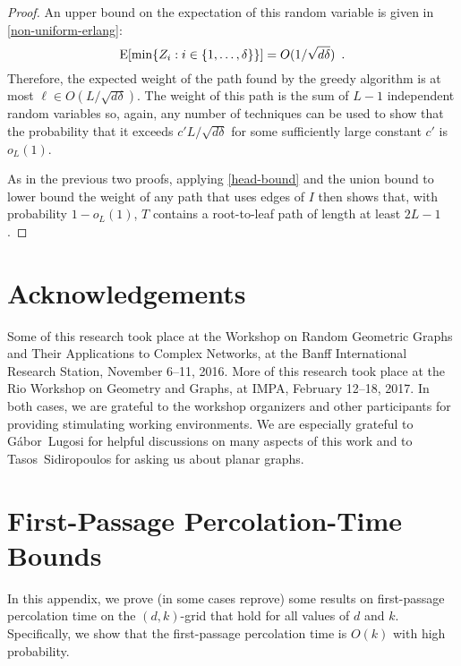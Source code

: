 \documentclass{patmorin}
\begin{document}
\begin{proof}
  An upper bound on the expectation of this random variable is given
  in \eqref{non-uniform-erlang}:
  \[ 
      \mathrm{E}[\min\{Z_i:i\in\{1,\ldots,\delta\}\}] = O(1/\sqrt{d\delta}) \enspace .
  \]
  Therefore, the expected weight of the path found by the greedy
  algorithm is at most $\ell \in O(L/\sqrt{d\delta})$.  The weight of
  this path is the sum of $L-1$ independent random variables so, again,
  any number of techniques can be used to show that the probability that
  it exceeds $c'L/\sqrt{d\delta}$ for some sufficiently large constant
  $c'$ is $o_L(1)$.  

  As in the previous two proofs, applying \eqref{head-bound} and the
  union bound to lower bound the weight of any path that uses edges
  of $I$ then shows that, with probability $1-o_L(1)$, $T$ contains a
  root-to-leaf path of length at least $2L-1$.
\end{proof}

 
\section*{Acknowledgements}

Some of this research took place at the Workshop on Random Geometric
Graphs and Their Applications to Complex Networks, at the Banff
International Research Station, November 6--11, 2016.  More of this
research took place at the Rio Workshop on Geometry and Graphs, at IMPA,
February 12--18, 2017.  In both cases, we are grateful to the workshop
organizers and other participants for providing stimulating working
environments.  We are especially grateful to G\'abor~Lugosi for helpful
discussions on many aspects of this work and to Tasos~Sidiropoulos
for asking us about planar graphs.




\appendix
\section{First-Passage Percolation-Time Bounds}

In this appendix, we prove (in some cases reprove) some results on
first-passage percolation time on the $(d,k)$-grid that hold for
all values of $d$ and $k$.  Specifically, we show that the first-passage
percolation time is $O(k)$ with high probability.
\end{document}
